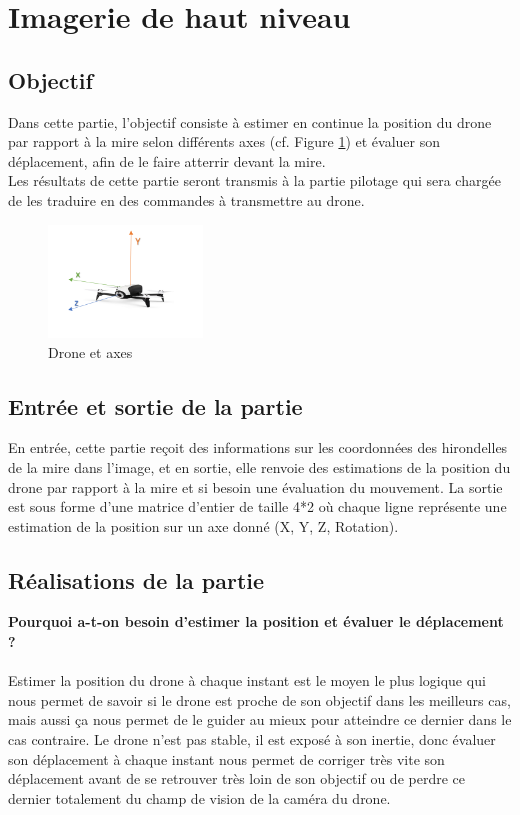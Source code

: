 \documentclass[12pt]{article}
\begin{document}
\section{Imagerie de haut niveau\label{haut}}


\subsection{Objectif}
Dans cette partie, l’objectif consiste à estimer en continue la position du drone par rapport à la mire selon différents axes (cf. Figure \ref{fig:image1})  et évaluer son déplacement, afin de le faire atterrir devant la mire. \\ 
Les résultats de cette partie seront transmis à la partie pilotage qui sera chargée de les traduire en des commandes à transmettre au drone.
\begin{figure}[H]
\centering
\includegraphics[height=3cm]{image1.PNG}
\caption{Drone et axes}
\label{fig:image1}
\end{figure}



\subsection{Entrée et sortie de la partie }
En entrée, cette partie reçoit des informations sur les coordonnées des hirondelles de la mire dans l'image, et en sortie, elle renvoie des estimations de la position du drone par rapport à la mire et si besoin une évaluation du mouvement. La sortie est sous forme d'une matrice d'entier de taille 4*2 où chaque ligne représente une estimation de la position sur un axe donné (X, Y, Z, Rotation).


\subsection{Réalisations de la partie}
\textbf{Pourquoi a-t-on besoin d’estimer la position et évaluer le déplacement ?} \\\\
Estimer la position du drone à chaque instant est le moyen le plus logique qui nous permet de savoir si le drone est proche de son objectif dans les meilleurs cas, mais aussi ça nous permet de le guider au mieux pour atteindre ce dernier dans le cas contraire.
Le drone n’est pas stable, il est exposé à son inertie, donc évaluer son déplacement à chaque instant nous permet de corriger très vite son déplacement avant de se retrouver très loin de son objectif ou de perdre ce dernier totalement du champ de vision de la caméra du drone. \\\\
\end{document}
